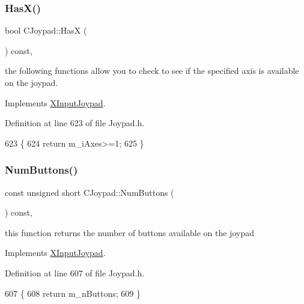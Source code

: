 \subsubsection{\texorpdfstring{Has\+X()}{HasX()}}
{\footnotesize\ttfamily bool C\+Joypad\+::\+HasX (\begin{DoxyParamCaption}{ }\end{DoxyParamCaption}) const\hspace{0.3cm}{\ttfamily [inline]}, {\ttfamily [virtual]}}

the following functions allow you to check to see if the specified axis is available on the joypad. 

Implements \hyperlink{struct_x_input_joypad_a9b5317808345c53bc0df5a3054dd0318}{X\+Input\+Joypad}.



Definition at line 623 of file Joypad.\+h.


\begin{DoxyCode}
623                       \{
624         \textcolor{keywordflow}{return} m\_iAxes>=1;
625     \}
\end{DoxyCode}
\mbox{\label{class_c_joypad_ab3a3683d1b12e2071af4751afc2d749c}} 
\subsubsection{\texorpdfstring{Num\+Buttons()}{NumButtons()}}
{\footnotesize\ttfamily const unsigned short C\+Joypad\+::\+Num\+Buttons (\begin{DoxyParamCaption}{ }\end{DoxyParamCaption}) const\hspace{0.3cm}{\ttfamily [inline]}, {\ttfamily [virtual]}}

this function returns the number of buttons available on the joypad 

Implements \hyperlink{struct_x_input_joypad_a9bc1d9930ca27e815b05542a7fd38a39}{X\+Input\+Joypad}.



Definition at line 607 of file Joypad.\+h.


\begin{DoxyCode}
607                                             \{
608         \textcolor{keywordflow}{return} m\_nButtons;
609     \}
\end{DoxyCode}
\mbox{\label{class_c_joypad_af40e2d5725c3e4d6bdc772e24bb52dca}} 
